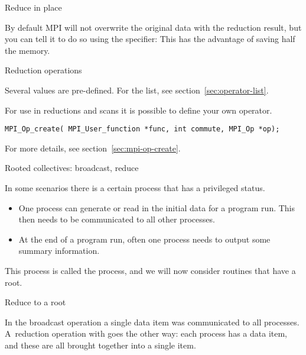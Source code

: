  {Reduce in place}
\label{sec:allreduce-inplace}

By default MPI will not overwrite the original data with the reduction
result, but you can tell it to do so
using the  specifier:
%
%
This has the advantage of saving half the memory.

 {Reduction operations}
\label{sec:mpi:op-reduct}

Several  values are pre-defined. For the list,
see section~\ref{sec:operator-list}.

For use in reductions and scans it is possible to define your own operator.

\begin{lstlisting}
MPI_Op_create( MPI_User_function *func, int commute, MPI_Op *op);
\end{lstlisting}

For more details, see section~\ref{sec:mpi-op-create}.

 {Rooted collectives: broadcast, reduce}
\label{sec:rooted}

In some scenarios there is a certain process that has a privileged status.
\begin{itemize}
\item
  One process can generate or read in the initial data for a program
  run. This then needs to be communicated to all other processes.
\item
  At the end of a program run, often
  one process needs to output some summary information.
\end{itemize}
This process is called the  process, and we will now
consider routines that have a root.

 {Reduce to a root}
\label{sec:reduce-root}

In the broadcast operation a single data item was communicated to all
processes. A~reduction operation with
%
%
goes the other way: each process has a
data item, and these are all brought together into a single item.

